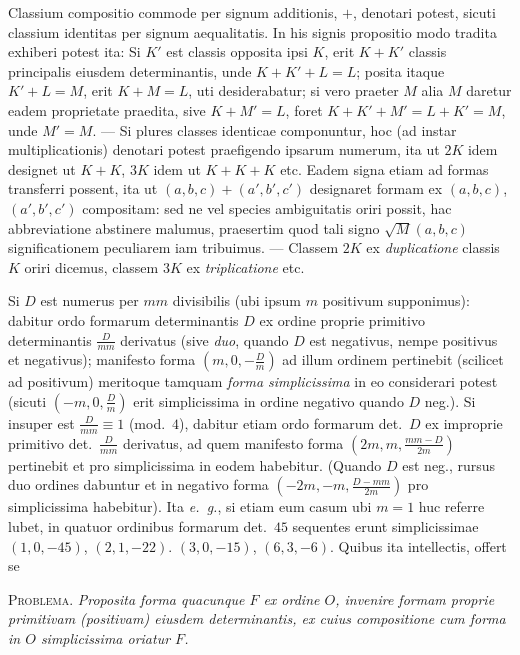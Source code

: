 Classium compositio commode per signum additionis, $+$, denotari potest, sicuti classium identitas per signum aequalitatis. In his signis propositio modo tradita exhiberi potest ita: Si $K'$ est classis opposita ipsi $K$, erit $K+K'$ classis principalis eiusdem determinantis, unde $K+K'+L=L$; posita itaque $K'+L=M$, erit $K+M=L$, uti desiderabatur; si vero praeter $M$ alia $M$ daretur eadem proprietate praedita, sive $K+M'=L$, foret $K+K'+M'=L+K'=M$, unde $M'=M$. --- Si plures classes identicae componuntur, hoc (ad instar multiplicationis) denotari potest praefigendo ipsarum numerum, ita ut $2K$ idem designet ut $K+K$, $3K$ idem ut $K+K+K$ etc. Eadem signa etiam ad formas transferri possent, ita ut $(a,b,c)+(a',b',c')$ designaret formam ex $(a,b,c)$, $(a',b',c')$ compositam: sed ne vel species ambiguitatis oriri possit, hac abbreviatione abstinere malumus, praesertim quod tali signo $\surd M(a,b,c)$ significationem peculiarem iam tribuimus. --- Classem $2K$ ex \textit{duplicatione} classis $K$ oriri dicemus, classem $3K$ ex \textit{triplicatione} etc.

Si $D$ est numerus per $mm$ divisibilis (ubi ipsum $m$ positivum supponimus): dabitur ordo formarum determinantis $D$ ex ordine proprie primitivo determinantis $\frac{D}{mm}$ derivatus (sive \textit{duo}, quando $D$ est negativus, nempe positivus et negativus); manifesto forma $(m,0,-\frac{D}{m})$ ad illum ordinem pertinebit (scilicet ad positivum) meritoque tamquam \textit{forma simplicissima} in eo considerari potest (sicuti $(-m,0,\frac{D}{m})$ erit simplicissima in ordine negativo quando $D$ neg.). Si insuper est $\frac{D}{mm}\equiv1$ (mod.\ $4$), dabitur etiam ordo formarum det.\ $D$ ex improprie primitivo det.\ $\frac{D}{mm}$ derivatus, ad quem manifesto forma $(2m,m,\frac{mm-D}{2m})$ pertinebit et pro simplicissima in eodem habebitur. (Quando $D$ est neg., rursus duo ordines dabuntur et in negativo forma $(-2m,-m,\frac{D-mm}{2m})$ pro simplicissima habebitur). Ita \textit{e.~g.}, si etiam eum casum ubi $m=1$ huc referre lubet, in quatuor ordinibus
formarum det.\ $45$ sequentes erunt simplicissimae $(1,0,-45)$, $(2,1,-22)$. $(3,0,-15)$, $(6,3,-6)$. Quibus ita intellectis, offert se

\textsc{Problema.} \textit{Proposita forma quacunque $F$ ex ordine $O$, invenire formam proprie primitivam (positivam) eiusdem determinantis, ex cuius compositione cum forma in $O$ simplicissima oriatur $F$.}

